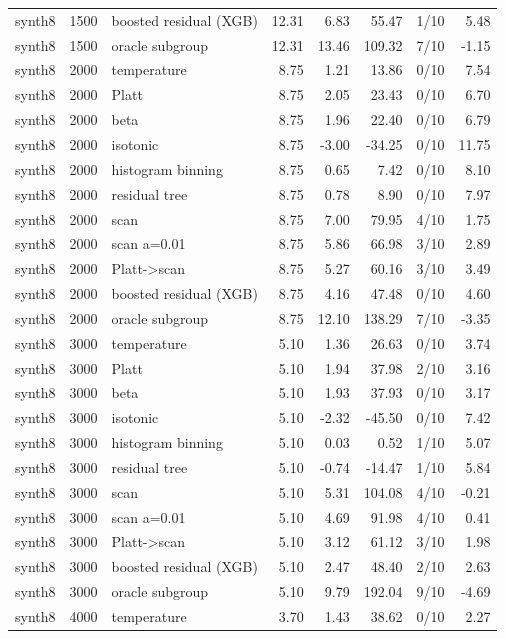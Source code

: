 \begin{tabular}{lllrrrlr}
synth8 & 1500 & boosted residual (XGB) & 12.31 & 6.83 & 55.47 & 1/10 & 5.48 \\
synth8 & 1500 & oracle subgroup & 12.31 & 13.46 & 109.32 & 7/10 & -1.15 \\
synth8 & 2000 & temperature & 8.75 & 1.21 & 13.86 & 0/10 & 7.54 \\
synth8 & 2000 & Platt & 8.75 & 2.05 & 23.43 & 0/10 & 6.70 \\
synth8 & 2000 & beta & 8.75 & 1.96 & 22.40 & 0/10 & 6.79 \\
synth8 & 2000 & isotonic & 8.75 & -3.00 & -34.25 & 0/10 & 11.75 \\
synth8 & 2000 & histogram binning & 8.75 & 0.65 & 7.42 & 0/10 & 8.10 \\
synth8 & 2000 & residual tree & 8.75 & 0.78 & 8.90 & 0/10 & 7.97 \\
synth8 & 2000 & scan & 8.75 & 7.00 & 79.95 & 4/10 & 1.75 \\
synth8 & 2000 & scan a=0.01 & 8.75 & 5.86 & 66.98 & 3/10 & 2.89 \\
synth8 & 2000 & Platt->scan & 8.75 & 5.27 & 60.16 & 3/10 & 3.49 \\
synth8 & 2000 & boosted residual (XGB) & 8.75 & 4.16 & 47.48 & 0/10 & 4.60 \\
synth8 & 2000 & oracle subgroup & 8.75 & 12.10 & 138.29 & 7/10 & -3.35 \\
synth8 & 3000 & temperature & 5.10 & 1.36 & 26.63 & 0/10 & 3.74 \\
synth8 & 3000 & Platt & 5.10 & 1.94 & 37.98 & 2/10 & 3.16 \\
synth8 & 3000 & beta & 5.10 & 1.93 & 37.93 & 0/10 & 3.17 \\
synth8 & 3000 & isotonic & 5.10 & -2.32 & -45.50 & 0/10 & 7.42 \\
synth8 & 3000 & histogram binning & 5.10 & 0.03 & 0.52 & 1/10 & 5.07 \\
synth8 & 3000 & residual tree & 5.10 & -0.74 & -14.47 & 1/10 & 5.84 \\
synth8 & 3000 & scan & 5.10 & 5.31 & 104.08 & 4/10 & -0.21 \\
synth8 & 3000 & scan a=0.01 & 5.10 & 4.69 & 91.98 & 4/10 & 0.41 \\
synth8 & 3000 & Platt->scan & 5.10 & 3.12 & 61.12 & 3/10 & 1.98 \\
synth8 & 3000 & boosted residual (XGB) & 5.10 & 2.47 & 48.40 & 2/10 & 2.63 \\
synth8 & 3000 & oracle subgroup & 5.10 & 9.79 & 192.04 & 9/10 & -4.69 \\
synth8 & 4000 & temperature & 3.70 & 1.43 & 38.62 & 0/10 & 2.27 \\

\end{tabular}
